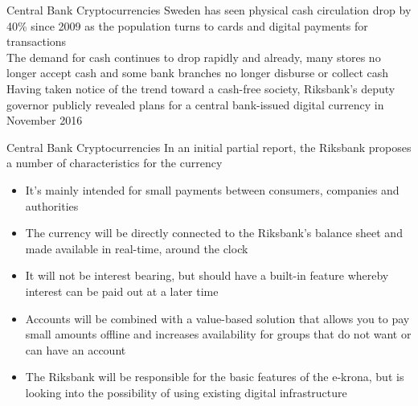 \documentclass[9pt]{beamer}
\begin{document}
\begin{frame}{Central Bank Cryptocurrencies}
	Sweden has seen physical cash circulation drop by 40\% since 2009 as the population turns to cards and digital payments for transactions\\ \vspace{3mm}
	The demand for cash continues to drop rapidly and already, many stores no longer accept cash and some bank branches no longer disburse or collect cash\\ \vspace{3mm}
	Having taken notice of the trend toward a cash-free society, Riksbank's deputy governor publicly revealed plans for a central bank-issued digital currency in November 2016\\ \vspace{3mm}
\end{frame}



\begin{frame}{Central Bank Cryptocurrencies}
	In an initial partial report, the Riksbank proposes a number of characteristics for the currency
	\begin{itemize}
		\item It's mainly intended for small payments between consumers, companies and authorities
		\item The currency will be directly connected to the Riksbank's balance sheet and made available in real-time, around the clock
		\item It will not be interest bearing, but should have a built-in feature whereby interest can be paid out at a later time
		\item Accounts will be combined with a value-based solution that allows you to pay small amounts offline and increases availability for groups that do not want or can have an account
		\item The Riksbank will be responsible for the basic features of the e-krona, but is looking into the possibility of using existing digital infrastructure
	\end{itemize}
\end{frame}

\end{document}
